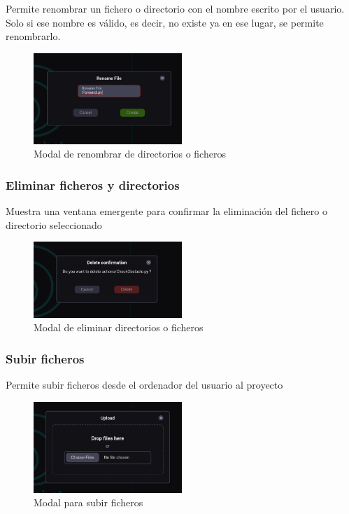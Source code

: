 Permite renombrar un fichero o directorio con el nombre escrito por el usuario. Solo si ese nombre es válido, es decir, no existe ya en ese lugar, se permite renombrarlo.

\begin{figure}[H]
    \centering
    \includegraphics[width=0.5\textwidth]{figures/bt-avances/bt-rename.png}
    \caption{Modal de renombrar de directorios o ficheros}
    \label{fig:bt-rename}
\end{figure}

\subsubsection{Eliminar ficheros y directorios}

Muestra una ventana emergente para confirmar la eliminación del fichero o directorio seleccionado

\begin{figure}[H]
    \centering
    \includegraphics[width=0.5\textwidth]{figures/bt-avances/bt-del.png}
    \caption{Modal de eliminar directorios o ficheros}
    \label{fig:bt-delete}
\end{figure}

\subsubsection{Subir ficheros}

Permite subir ficheros desde el ordenador del usuario al proyecto

\begin{figure}[H]
    \centering
    \includegraphics[width=0.5\textwidth]{figures/bt-avances/bt-upload.png}
    \caption{Modal para subir ficheros}
    \label{fig:bt-upload}
\end{figure}

